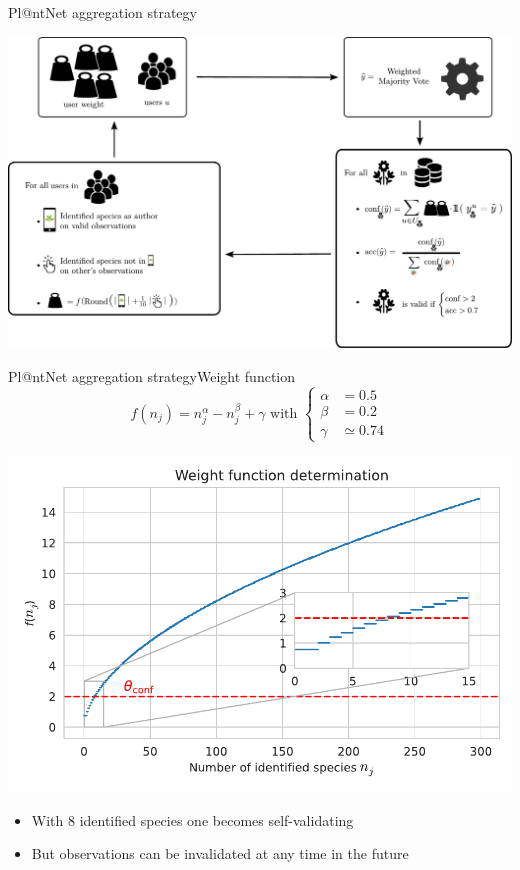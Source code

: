 \begin{frame}{Pl@ntNet aggregation strategy}
    \begin{center}
        \includegraphics[width=\textwidth]{../chapters/images_plantnet/schema_plantnet_aggregation.pdf}
    \end{center}
\end{frame}

\begin{frame}{Pl@ntNet aggregation strategy}{Weight function}
\[f(n_j)=n_j^\alpha -n_j^\beta + \gamma \text{ with }\begin{cases} \alpha&=0.5 \\ \beta &=0.2 \\ \gamma&\simeq 0.74\end{cases}\]

\begin{center}
    \includegraphics[width=.6\textwidth]{../chapters/images_plantnet/weight_function.pdf}
\end{center}

\begin{itemize}
    \item With 8 identified species one becomes self-validating
    \item<2> But observations can be invalidated at any time in the future
\end{itemize}
\end{frame}

